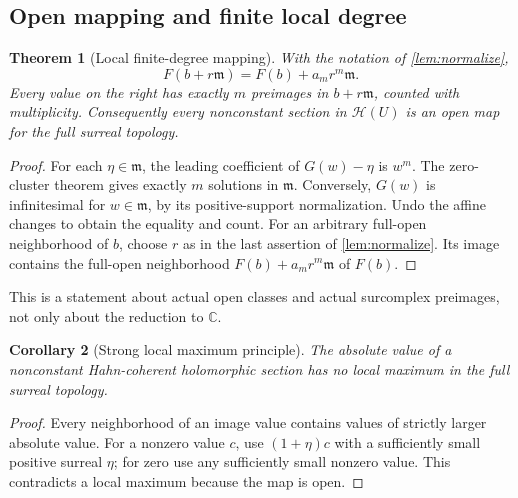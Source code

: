 \documentclass[11pt,oneside]{article}
\numberwithin{equation}{section}
\newtheorem{theorem}{Theorem}[section]
\newtheorem{corollary}[theorem]{Corollary}
\theoremstyle{definition}
\theoremstyle{remark}\newtheorem{remark}[theorem]{Remark}
\newcommand{\C}{\mathbb C}
\newcommand{\HH}{\mathscr H}
\newcommand{\m}{\mathfrak m}
\begin{document}
\subsection{Open mapping and finite local degree}
\begin{theorem}[Local finite-degree mapping]\label{thm:open}
With the notation of \cref{lem:normalize},
\[
 F(b+r\m)=F(b)+a_mr^m\m.
\]
Every value on the right has exactly $m$ preimages in $b+r\m$, counted
with multiplicity. Consequently every nonconstant section in $\HH(U)$
is an open map for the full surreal topology.
\end{theorem}
\begin{proof}
For each $\eta\in\m$, the leading coefficient of $G(w)-\eta$ is $w^m$.
The zero-cluster theorem gives exactly $m$ solutions in $\m$.
Conversely, $G(w)$ is infinitesimal for $w\in\m$, by its positive-support
normalization. Undo the affine changes to obtain the equality and count.
For an arbitrary full-open neighborhood of $b$, choose $r$ as in the
last assertion of \cref{lem:normalize}. Its image contains the full-open
neighborhood $F(b)+a_mr^m\m$ of $F(b)$.
\end{proof}
This is a statement about actual open classes and actual surcomplex
preimages, not only about the reduction to $\C$.

\begin{corollary}[Strong local maximum principle]\label{cor:max}
The absolute value of a nonconstant Hahn-coherent holomorphic section
has no local maximum in the full surreal topology.
\end{corollary}
\begin{proof}
Every neighborhood of an image value contains values of strictly larger
absolute value. For a nonzero value $c$, use $(1+\eta)c$ with a sufficiently
small positive surreal $\eta$; for zero use any sufficiently small
nonzero value. This contradicts a local maximum because the map is open.
\end{proof}
\end{document}
